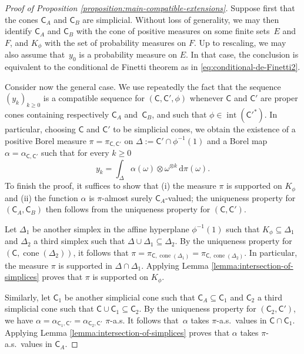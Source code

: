 \documentclass{amsart}
\renewcommand{\geq}{\geqslant}
\renewcommand{\subset}{\subseteq}
\newcommand{\gC}{\mathsf{C}}
\DeclareMathOperator{\cone}{\mathrm{cone}}
\DeclareMathOperator{\inter}{int}
\theoremstyle{plain}
\begin{document}
\begin{proof}[Proof of Proposition \ref{proposition:main-compatible-extensions}]
Suppose first that the cones $\gC_A$ and $\gC_B$ are simplicial. Without loss of generality, we may then identify $\gC_A$ and $\gC_B$ with the cone of positive measures on some finite sets~$E$ and $F$, and $K_\phi$ with the set of probability measures on $F$. Up to rescaling, we may also assume that~$y_0$ is a probability measure on $E$. In that case, the conclusion is equivalent to the conditional de Finetti theorem as in \eqref{eq:conditional-de-Finetti2}.

Consider now the general case. We use repeatedly the fact that the sequence $(y_k)_{k \geq 0}$ is a compatible sequence for $(\gC,\gC',\phi)$ whenever $\gC$ and $\gC'$ are proper cones containing respectively $\gC_A$ and~$\gC_B$, and such that $\phi \in \inter(\gC'^*)$. In particular, choosing $\gC$ and $\gC'$ to be simplicial cones, we obtain the existence of
a positive Borel measure $\pi=\pi_{\gC,\gC'}$ on $\Delta := \gC' \cap \phi^{-1}(1)$ and a Borel map $\alpha=\alpha_{\gC,\gC'}$ such that for every $k \geq 0$
\[ y_k = \int_{\Delta} \alpha(\omega) \otimes \omega^{\otimes k} \, \mathrm{d} \pi(\omega). \]
To finish the proof, it suffices to show that (i) the measure $\pi$ is supported on $K_\phi$ and (ii) the function $\alpha$ is $\pi$-almost surely $\gC_A$-valued; the uniqueness property for $(\gC_A,\gC_B)$ then follows from the uniqueness property for $(\gC,\gC')$.

Let $\Delta_1$ be another simplex in the affine hyperplane $\phi^{-1}(1)$ such that $K_\phi \subset \Delta_1$ and $\Delta_2$ a third simplex such that $\Delta \cup \Delta_1 \subset \Delta_2$. By the uniqueness property for $(\gC,\cone(\Delta_2))$, it follows that $\pi=\pi_{\gC,\cone(\Delta_1)}=\pi_{\gC,\cone(\Delta_2)}$. In particular, the measure $\pi$ is supported in $\Delta \cap \Delta_1$. Applying Lemma \ref{lemma:intersection-of-simplices} proves that $\pi$ is supported on $K_\phi$.

Similarly, let $\gC_1$ be another simplicial cone such that $\gC_A\subset \gC_1$ and $\gC_2$ a third simplicial cone such that $\gC \cup \gC_1\subset \gC_2$. By the uniqueness property for $(\gC_2,\gC')$,  we have $\alpha=\alpha_{\gC_1,\gC'}=\alpha_{\gC_2,\gC'}$ $\pi$-a.s. It follows that~$\alpha$ takes $\pi$-a.s.\ values in $\gC \cap \gC_1$. Applying Lemma \ref{lemma:intersection-of-simplices} proves that $\alpha$ takes $\pi$-a.s.\ values in $\gC_A$.
\end{proof}
\end{document}

